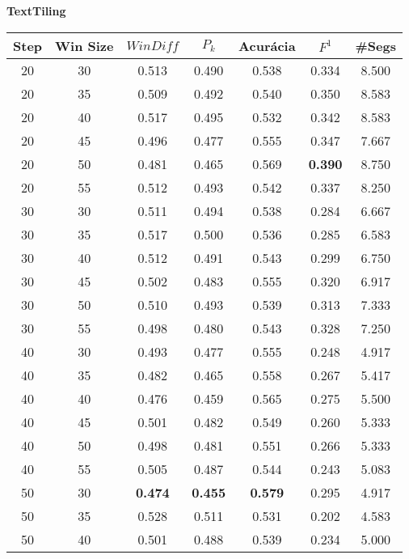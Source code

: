 \documentclass{article}
\begin{document}
 
\small

{  
\large
\center
	\textbf{TextTiling}  

}

\begin{longtable}[c]{|c|c|c|c|c|c|c|} 
\hline 
 Step & Win Size & $WinDiff$ & $P_k$ & Acurácia & $F^1$ & \#Segs\\ \hline 
 20 & 30 & 0.513 & 0.490 & 0.538 & 0.334 & 8.500  \\ \hline 
 20 & 35 & 0.509 & 0.492 & 0.540 & 0.350 & 8.583  \\ \hline 
 20 & 40 & 0.517 & 0.495 & 0.532 & 0.342 & 8.583  \\ \hline 
 20 & 45 & 0.496 & 0.477 & 0.555 & 0.347 & 7.667  \\ \hline 
 20 & 50 & 0.481 & 0.465 & 0.569 & \cellcolor{gray!20} \textbf{0.390} & 8.750  \\ \hline 
 20 & 55 & 0.512 & 0.493 & 0.542 & 0.337 & 8.250  \\ \hline 
 30 & 30 & 0.511 & 0.494 & 0.538 & 0.284 & 6.667  \\ \hline 
 30 & 35 & 0.517 & 0.500 & 0.536 & 0.285 & 6.583  \\ \hline 
 30 & 40 & 0.512 & 0.491 & 0.543 & 0.299 & 6.750  \\ \hline 
 30 & 45 & 0.502 & 0.483 & 0.555 & 0.320 & 6.917  \\ \hline 
 30 & 50 & 0.510 & 0.493 & 0.539 & 0.313 & 7.333  \\ \hline 
 30 & 55 & 0.498 & 0.480 & 0.543 & 0.328 & 7.250  \\ \hline 
 40 & 30 & 0.493 & 0.477 & 0.555 & 0.248 & 4.917  \\ \hline 
 40 & 35 & 0.482 & 0.465 & 0.558 & 0.267 & 5.417  \\ \hline 
 40 & 40 & 0.476 & 0.459 & 0.565 & 0.275 & 5.500  \\ \hline 
 40 & 45 & 0.501 & 0.482 & 0.549 & 0.260 & 5.333  \\ \hline 
 40 & 50 & 0.498 & 0.481 & 0.551 & 0.266 & 5.333  \\ \hline 
 40 & 55 & 0.505 & 0.487 & 0.544 & 0.243 & 5.083  \\ \hline 
 50 & 30 & \cellcolor{gray!20} \textbf{0.474} & \cellcolor{gray!20} \textbf{0.455} & \cellcolor{gray!20} \textbf{0.579} & 0.295 & 4.917  \\ \hline 
 50 & 35 & 0.528 & 0.511 & 0.531 & 0.202 & 4.583  \\ \hline 
 50 & 40 & 0.501 & 0.488 & 0.539 & 0.234 & 5.000  \\ \hline 

\end{longtable}
\end{document}
